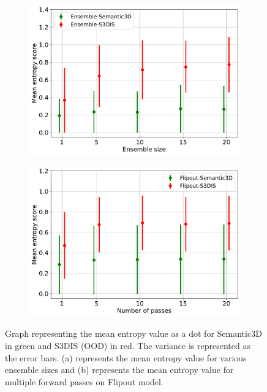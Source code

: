     \begin{figure}[!ht]
        \begin{subfigure}{0.98\textwidth}
            \centering
        \includegraphics[scale=0.5]{images/MSP/Ensembles_ENT_semvs3d.pdf}
        \caption{}
        \label{fig:ent_ensembles}
        \end{subfigure}
        \begin{subfigure}{0.98\textwidth}
            \centering
        \includegraphics[scale=0.5]{images/MSP/Flipout_ENT_semvs3d.pdf}
        \caption{}
        \label{fig:ent_flipout}
        \end{subfigure}
        \caption{Graph representing the mean entropy value as a dot for Semantic3D in green and S3DIS (OOD) in red. The variance is represented as the error bars.  (a) represents the mean entropy value for various ensemble sizes and (b) represents the mean entropy value for multiple forward passes on Flipout model.}
    \end{figure}
